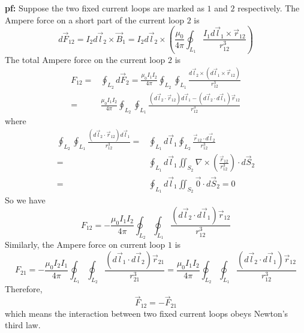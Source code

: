 \documentclass[10pt,a4paper]{article}
\begin{document}
\textbf{pf:} Suppose the two fixed current loops are marked as $1$ and $2$ respectively.
The Ampere force on a short part of the current loop $2$ is
\[
d\vec{F}_{12}=I_2d\vec{l}_2\times\vec{B}_1=I_2d\vec{l}_2\times(\frac{\mu_0}{4\pi}\oint_{L_1}\frac{I_1d\vec{l}_1\times\vec{r}_{12}}{r_{12}^3})
\]
The total Ampere force on the current loop $2$ is
\begin{align*}
F_{12}=&\oint_{L_2}d\vec{F}_2=\frac{\mu_0I_1I_2}{4\pi}\oint_{L_2}\oint_{L_1}\frac{d\vec{l}_2\times(d\vec{l}_1\times\vec{r}_{12})}{r_{12}^3}\\
=&\frac{\mu_0I_1I_2}{4\pi}\oint_{L_2}\oint_{L_1}\frac{(d\vec{l}_2\cdot\vec{r}_{12})d\vec{l}_1-(d\vec{l}_2\cdot d\vec{l}_1)\vec{r}_{12}}{r_{12}^3}
\end{align*}
where
\begin{align*}
\oint_{L_2}\oint_{L_1}\frac{(d\vec{l}_2\cdot\vec{r}_{12})d\vec{l}_1}{r_{12}^3}=&\oint_{L_1}d\vec{l}_1\oint_{L_2}\frac{\vec{r}_{12}\cdot d\vec{l}_2}{r_{12}^3}\\
=&\oint_{L_1}d\vec{l}_1\iint_{S_2}\nabla\times(\frac{\vec{r}_12}{r_{12}^3})\cdot d\vec{S}_2\\
=&\oint_{L_1}d\vec{l}_1\iint_{S_2}\vec{0}\cdot d\vec{S}_2=0
\end{align*}
So we have
\[
F_{12}=-\frac{\mu_0I_1I_2}{4\pi}\oint_{L_2}\oint_{L_1}\frac{(d\vec{l}_2\cdot d\vec{l}_{1})\vec{r}_{12}}{r_{12}^3}
\]
Similarly, the Ampere force on  current loop $1$ is
\[
F_{21}=-\frac{\mu_0I_2I_1}{4\pi}\oint_{L_1}\oint_{L_2}\frac{(d\vec{l}_1\cdot d\vec{l}_2)\vec{r}_{21}}{r_{21}^3}=\frac{\mu_0I_1I_2}{4\pi}\oint_{L_2}\oint_{L_1}\frac{(d\vec{l}_2\cdot d\vec{l}_{1})\vec{r}_{12}}{r_{12}^3}
\]
Therefore,
\[
\vec{F}_{12}=-\vec{F}_{21}
\]
which means the interaction between two fixed current loops obeys Newton's third law.
\end{document}
